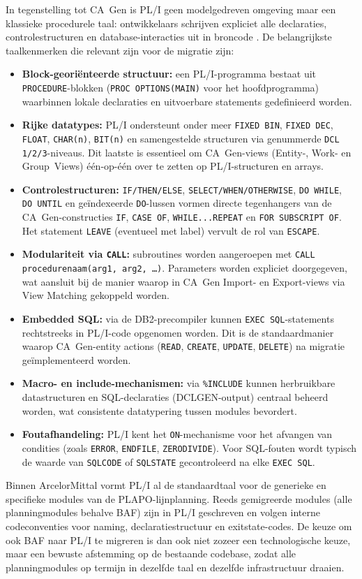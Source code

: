  In tegenstelling tot CA~Gen is PL/I geen modelgedreven omgeving maar een klassieke procedurele taal: ontwikkelaars 
 schrijven expliciet alle declaraties, controlestructuren en database-interacties uit in broncode \autocite{IBM2025}. De belangrijkste 
 taalkenmerken die relevant zijn voor de migratie zijn:

 \begin{itemize}
     \item \textbf{Block-georiënteerde structuur:} een PL/I-programma bestaat uit \texttt{PROCEDURE}-blokken (\texttt{PROC OPTIONS(MAIN)} voor het hoofdprogramma) waarbinnen lokale declaraties en uitvoerbare statements gedefinieerd worden.
     \item \textbf{Rijke datatypes:} PL/I ondersteunt onder meer \texttt{FIXED BIN}, \texttt{FIXED DEC}, \texttt{FLOAT}, \texttt{CHAR(n)}, \texttt{BIT(n)} en samengestelde structuren via genummerde \texttt{DCL 1/2/3}-niveaus. Dit laatste is essentieel om CA~Gen-views (Entity-, Work- en Group~Views) één-op-één over te zetten op PL/I-structuren en arrays.
     \item \textbf{Controlestructuren:} \texttt{IF/THEN/ELSE}, \texttt{SELECT/WHEN/OTHERWISE}, \texttt{DO~WHILE}, \texttt{DO~UNTIL} en geïndexeerde \texttt{DO}-lussen vormen directe tegenhangers van de CA~Gen-constructies \texttt{IF}, \texttt{CASE OF}, \texttt{WHILE...REPEAT} en \texttt{FOR SUBSCRIPT OF}. Het statement \texttt{LEAVE} (eventueel met label) vervult de rol van \texttt{ESCAPE}.
     \item \textbf{Modulariteit via \texttt{CALL}:} subroutines worden aangeroepen met \texttt{CALL procedurenaam(arg1, arg2, \dots)}. Parameters worden expliciet doorgegeven, wat aansluit bij de manier waarop in CA~Gen Import- en Export-views via View Matching gekoppeld worden.
     \item \textbf{Embedded SQL:} via de DB2-precompiler kunnen \texttt{EXEC SQL}-statements rechtstreeks in PL/I-code opgenomen worden. Dit is de standaardmanier waarop CA~Gen-entity actions (\texttt{READ}, \texttt{CREATE}, \texttt{UPDATE}, \texttt{DELETE}) na migratie geïmplementeerd worden.
     \item \textbf{Macro- en include-mechanismen:} via \texttt{\%INCLUDE} kunnen herbruikbare datastructuren en SQL-declaraties (DCLGEN-output) centraal beheerd worden, wat consistente datatypering tussen modules bevordert.
     \item \textbf{Foutafhandeling:} PL/I kent het \texttt{ON}-mechanisme voor het afvangen van condities (zoals \texttt{ERROR}, \texttt{ENDFILE}, \texttt{ZERODIVIDE}). Voor SQL-fouten wordt typisch de waarde van \texttt{SQLCODE} of \texttt{SQLSTATE} gecontroleerd na elke \texttt{EXEC SQL}.
 \end{itemize}

 Binnen ArcelorMittal vormt PL/I al de standaardtaal voor de generieke en specifieke modules van de PLAPO-lijnplanning. Reeds gemigreerde modules (alle planningmodules behalve BAF) zijn in PL/I geschreven en volgen interne codeconventies voor naming, declaratiestructuur en exitstate-codes. De keuze om ook BAF naar PL/I te migreren is dan ook niet zozeer een technologische keuze, maar een bewuste afstemming op de bestaande codebase, zodat alle planningmodules op termijn in dezelfde taal en dezelfde infrastructuur draaien.
 